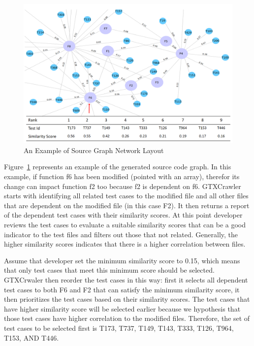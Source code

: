 \begin{figure}[!ht]
	\centering
	\includegraphics[width=0.90\linewidth]{./networklayout.png}
	\vspace*{-5pt}
	\caption{An Example of Source Graph Network Layout}
	\label{fig:graph}
	\vspace*{-10pt}
\end{figure}



Figure~\ref{fig:graph} represents an example 
of the generated source code graph. In this example, 
if function f6 has been modified (pointed with an array), 
therefor its change can impact function f2 too because 
f2 is dependent on f6. 
GTXCrawler starts with identifying all 
related test cases to the modified file and
all other files that are dependent on the modified 
file (in this case F2). It then returns a report of the
dependent test cases with their similarity scores. 
At this point developer reviews the test cases to evaluate 
a suitable similarity scores that can be a good indicator 
to the test files and filters out those that not related.
Generally, the higher similarity scores indicates that 
there is a higher correlation between files. 

Assume that developer set the minimum similarity score to 0.15,
which means that only test cases that meet this minimum 
score should be selected. 
GTXCrwaler then reorder the test cases in this way:
first it selects all dependent test cases to both F6 and F2 
that can satisfy the minimum similarity score, it then 
prioritizes the test cases based on their similarity scores.
The test cases that have higher similarity score will be 
selected earlier because we hypothesis that those test cases
have higher correlation to the modified files. 
Therefore,  the set of test cases to be selected first is T173, 
T737, T149, T143, T333, T126, T964, T153, AND T446.









